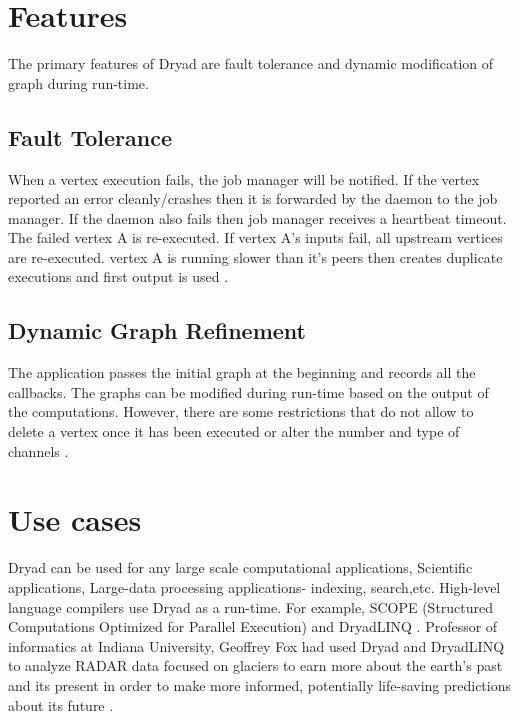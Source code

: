\documentclass[9pt,twocolumn,twoside]{../../styles/osajnl}
\begin{document}
\section{Features}
The primary features of Dryad are fault tolerance and dynamic modification of graph during run-time. \subsection{Fault Tolerance}
When a vertex execution fails, the job manager will be notified. If the vertex reported an error cleanly/crashes then it is forwarded by the daemon to the job manager. If the daemon also fails then job manager receives a heartbeat timeout. The failed vertex A is re-executed. If vertex A's inputs fail, all upstream vertices are re-executed. vertex A is running slower than it's peers then creates duplicate executions and first output is used \cite{www-DryadYT}.
\subsection{Dynamic Graph Refinement}
The application passes the initial graph at the beginning and records all the callbacks. The graphs can be modified during run-time based on the output of the computations. However, there are some restrictions that do not allow to delete a vertex once it has been executed or alter the number and type of channels \cite{www-DryadYT}. 
\section{Use cases}
Dryad can be used for any large scale computational applications, Scientific applications, Large-data processing applications- indexing, search,etc. High-level language compilers use Dryad as a run-time. For example, SCOPE (Structured Computations Optimized for Parallel Execution) and DryadLINQ \cite{www-DryadWiki}. Professor of informatics at Indiana University, Geoffrey Fox had used Dryad and DryadLINQ to analyze RADAR data focused on glaciers to earn more about the earth’s past and its present in order to make more informed, potentially life-saving predictions about its future \cite{www-DryadUse}.
\end{document}
